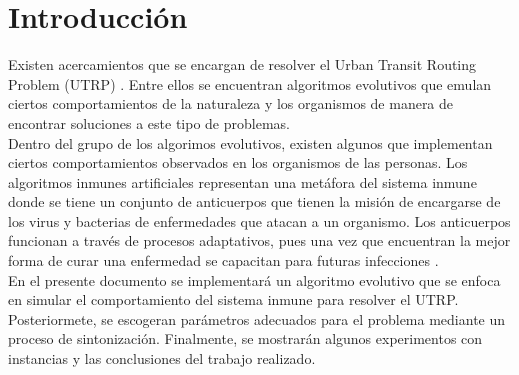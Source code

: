 \section{Introducción}

Existen acercamientos que se encargan de resolver el Urban Transit Routing Problem (UTRP) \cite{metaheuristic2010}. Entre ellos se encuentran algoritmos evolutivos que emulan ciertos comportamientos de la naturaleza y los organismos de manera de encontrar soluciones a este tipo de problemas. \\

Dentro del grupo de los algorimos evolutivos, existen algunos que implementan ciertos comportamientos observados en los organismos de las personas. Los algoritmos inmunes artificiales representan una metáfora del sistema inmune donde se tiene un conjunto de anticuerpos que tienen la misión de encargarse de los virus y bacterias de enfermedades que atacan a un organismo. Los anticuerpos funcionan a través de procesos adaptativos, pues una vez que encuentran la mejor forma de curar una enfermedad se capacitan para futuras infecciones \cite{introduction} \cite{sia}. \\

En el presente documento se implementará un algoritmo evolutivo que se enfoca en simular el comportamiento del sistema inmune para resolver el UTRP. Posteriormete, se escogeran parámetros adecuados para el problema mediante un proceso de sintonización. Finalmente, se mostrarán algunos experimentos con instancias y las conclusiones del trabajo realizado.


